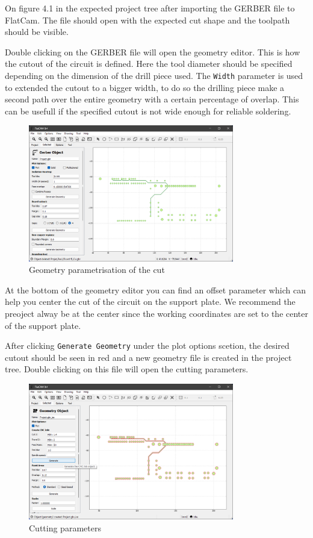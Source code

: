 \documentclass[11pt, openright]{book}
\begin{document}
    On figure 4.1 in the expected project tree after importing the GERBER file to FlatCam. The file should open with the expected cut shape and the toolpath should be visible.

    Double clicking on the GERBER file will open the geometry editor. This is how the cutout of the circuit is defined. Here the tool diameter should be specified depending on the dimension of the drill piece used. The \texttt{Width} parameter is used to extended the cutout to a bigger width, to do so the drilling piece make a second path over the entire geometry with a certain percentage of overlap. This can be usefull if the specified cutout is not wide enough for reliable soldering. 

    \begin{figure}[ht!]
        \centering
        \includegraphics[width=0.8\textwidth]{./includes/G2.png}
        \caption{Geometry parametrisation of the cut}
    \end{figure}

    At the bottom of the geometry editor you can find an offset parameter which can help you center the cut of the circuit on the support plate. We recommend the preoject alway be at the center since the working coordinates are set to the center of the support plate.  

    After clicking \texttt{Generate Geometry} under the plot options scetion, the desired cutout should be seen in red and a new geometry file is created in the project tree. Double clicking on this file will open the cutting parameters. 

    \begin{figure}[ht!]
        \centering
        \includegraphics[width=0.8\textwidth]{./includes/G3.png}
        \caption{Cutting parameters}
    \end{figure}
\end{document}
